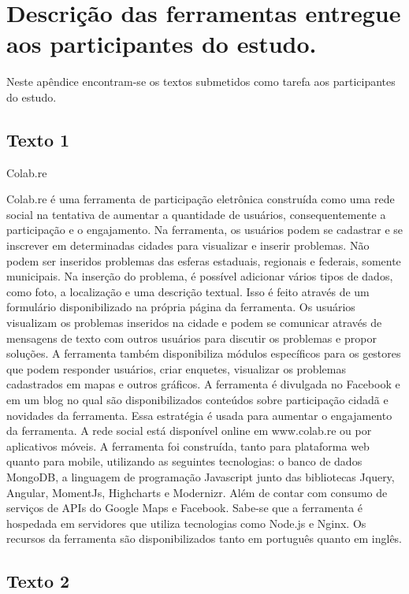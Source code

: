 \chapter{Descrição das ferramentas entregue aos participantes do estudo.}
\label{apendice:c}

\par
Neste apêndice encontram-se os textos submetidos como tarefa aos participantes do estudo.

\section{Texto 1}
\label{sec:text1}
Colab.re

Colab.re é uma ferramenta de participação eletrônica construída como uma rede social na tentativa de aumentar a quantidade de usuários, consequentemente a participação e o engajamento. 
Na ferramenta,  os usuários podem se cadastrar e se inscrever em determinadas cidades para visualizar e inserir problemas. Não podem ser inseridos problemas das esferas estaduais, 
regionais e federais, somente municipais. Na inserção do problema, é possível adicionar vários tipos de dados, como foto, a localização e uma descrição textual. Isso é feito através
de um formulário disponibilizado na própria página da ferramenta. Os usuários visualizam os problemas inseridos na cidade e podem se comunicar através de mensagens de texto com outros
usuários para discutir os problemas e propor soluções. A ferramenta também  disponibiliza módulos específicos para os gestores que podem responder usuários, criar enquetes, 
visualizar os problemas cadastrados em mapas e outros gráficos. A ferramenta é divulgada no Facebook e em um blog no qual são disponibilizados conteúdos sobre participação
cidadã e novidades da ferramenta. Essa estratégia é usada para aumentar o engajamento da ferramenta. A rede social está disponível online  em www.colab.re ou por
aplicativos móveis. A ferramenta foi construída, tanto para plataforma web quanto para mobile, utilizando as seguintes tecnologias: o banco de dados MongoDB, a linguagem de 
programação Javascript junto das bibliotecas Jquery, Angular, MomentJs, Highcharts e Modernizr. Além de contar com consumo de serviços de APIs do Google Maps e Facebook. 
Sabe-se que a ferramenta é hospedada em servidores que utiliza tecnologias como Node.js e Nginx. Os recursos da ferramenta são disponibilizados tanto em português quanto em inglês. 

\section{Texto 2}
\label{sec:text2}

